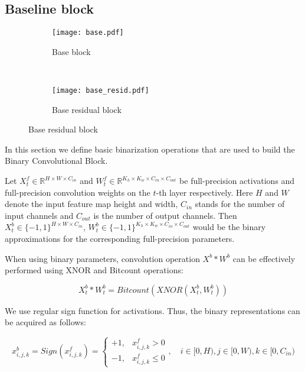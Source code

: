 \documentclass{article}
\begin{document}
\subsection{Baseline block}

\begin{figure}[t]
\centering
\begin{subfigure}[b]{0.8\textwidth}
    \centering
   \texttt{[image: base.pdf]}
   \caption{Base block}
   \label{block:a} 
\end{subfigure}
~
\begin{subfigure}[b]{0.8\textwidth}
    \centering
   \texttt{[image: base\_resid.pdf]}
   \caption{Base residual block}
   \label{block:b} 
\end{subfigure}
\end{figure}

In this section we define basic binarization operations that are used to build the Binary Convolutional Block.

Let $X_t^f \in \mathbb{R}^{H \times W \times C_{in}}$ and $W_t^f \in \mathbb{R}^{K_{h} \times K_{w} \times C_{in} \times C_{out}}$ be full-precision activations and full-precision convolution weights on the $t$-th layer respectively. Here $H$ and $W$ denote the input feature map height and width, $C_{in}$ stands for the number of input channels and $C_{out}$ is the number of output channels. Then $X_t^b \in \{-1, 1\}^{H \times W \times C_{in}}$, $W_t^b \in \{-1, 1\}^{K_{h} \times K_{w} \times C_{in} \times C_{out}}$ would be the binary approximations for the corresponding full-precision parameters.

When using binary parameters, convolution operation $X^b \ast W^b$ can be effectively performed using XNOR and Bitcount operations:

\begin{equation*}
    X_t^b \ast W_t^b = Bitcount(XNOR(X_t^b, W_t^b))
\end{equation*}

We use regular sign function for activations. Thus, the binary representations can be acquired as follows:

\begin{equation}
    x_{i, j, k}^b = Sign(x_{i, j, k}^f) = 
    \begin{cases}
        +1, & x_{i, j, k}^f > 0 \\
        -1, & x_{i, j, k}^f \le 0
    \end{cases}, \quad
    i \in [0, H), j \in [0, W), k \in [0, C_{in})
\label{eq_act_sign}
\end{equation}
\end{document}

